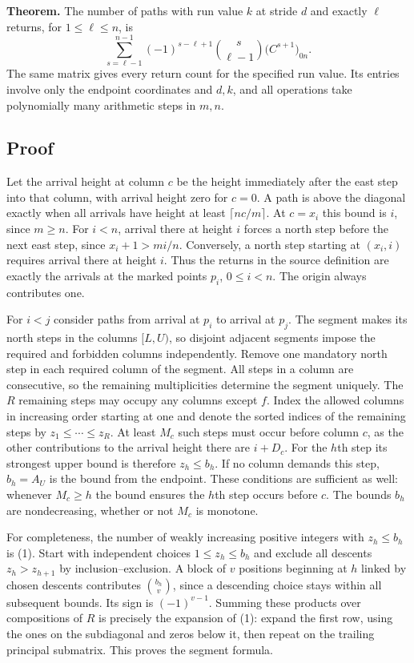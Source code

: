 \documentclass[11pt]{article}
\begin{document}
\textbf{Theorem.} The number of paths with run value $k$ at stride $d$ and exactly $\ell$ returns, for $1\le\ell\le n$, is
\[
 \boxed{\displaystyle\sum_{s=\ell-1}^{n-1}
 (-1)^{s-\ell+1}\binom{s}{\ell-1}\big(C^{s+1}\big)_{0n}.}
 \tag{2}
\]
The same matrix gives every return count for the specified run value. Its entries involve only the endpoint coordinates and $d,k$, and all operations take polynomially many arithmetic steps in $m,n$.

\subsection*{Proof}
Let the arrival height at column $c$ be the height immediately after the east step into that column, with arrival height zero for $c=0$. A path is above the diagonal exactly when all arrivals have height at least $\lceil nc/m\rceil$. At $c=x_i$ this bound is $i$, since $m\ge n$. For $i<n$, arrival there at height $i$ forces a north step before the next east step, since $x_i+1>mi/n$. Conversely, a north step starting at $(x_i,i)$ requires arrival there at height $i$. Thus the returns in the source definition are exactly the arrivals at the marked points $p_i$, $0\le i<n$. The origin always contributes one.

For $i<j$ consider paths from arrival at $p_i$ to arrival at $p_j$. The segment makes its north steps in the columns $[L,U)$, so disjoint adjacent segments impose the required and forbidden columns independently. Remove one mandatory north step in each required column of the segment. All steps in a column are consecutive, so the remaining multiplicities determine the segment uniquely. The $R$ remaining steps may occupy any columns except $f$. Index the allowed columns in increasing order starting at one and denote the sorted indices of the remaining steps by $z_1\le\cdots\le z_R$. At least $M_c$ such steps must occur before column $c$, as the other contributions to the arrival height there are $i+D_c$. For the $h$th step its strongest upper bound is therefore $z_h\le b_h$. If no column demands this step, $b_h=A_U$ is the bound from the endpoint. These conditions are sufficient as well: whenever $M_c\ge h$ the bound ensures the $h$th step occurs before $c$. The bounds $b_h$ are nondecreasing, whether or not $M_c$ is monotone.

For completeness, the number of weakly increasing positive integers with $z_h\le b_h$ is (1). Start with independent choices $1\le z_h\le b_h$ and exclude all descents $z_h>z_{h+1}$ by inclusion--exclusion. A block of $v$ positions beginning at $h$ linked by chosen descents contributes $\binom{b_h}{v}$, since a descending choice stays within all subsequent bounds. Its sign is $(-1)^{v-1}$. Summing these products over compositions of $R$ is precisely the expansion of (1): expand the first row, using the ones on the subdiagonal and zeros below it, then repeat on the trailing principal submatrix. This proves the segment formula.
\end{document}
